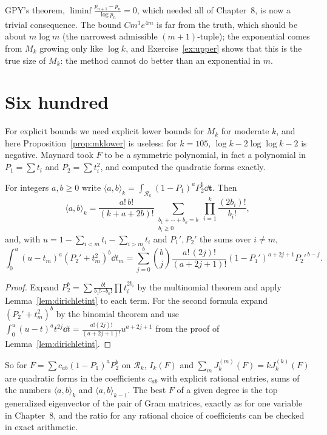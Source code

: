 GPY's theorem, $\liminf\frac{p_{n+1}-p_n}{\log p_n}=0$, which needed all of Chapter~8, is now a trivial consequence. The bound $Cm^3e^{4m}$ is far from the truth, which should be about $m\log m$ (the narrowest admissible $(m+1)$-tuple); the exponential comes from $M_k$ growing only like $\log k$, and Exercise~\ref{ex:upper} shows that this is the true size of $M_k$: the method cannot do better than an exponential in $m$.

\section{Six hundred}

For explicit bounds we need explicit lower bounds for $M_k$ for moderate $k$, and here Proposition~\ref{prop:mklower} is useless: for $k=105$, $\log k-2\log\log k-2$ is negative. Maynard took $F$ to be a symmetric polynomial, in fact a polynomial in $P_1=\sum t_i$ and $P_2=\sum t_i^2$, and computed the quadratic forms exactly.

\begin{lemma}\label{lem:symint}
For integers $a,b\ge0$ write $\langle a,b\rangle_k=\int_{\mathcal R_k}(1-P_1)^aP_2^b\dd\mathbf t$. Then
\[
\langle a,b\rangle_k=\frac{a!\,b!}{(k+a+2b)!}\sum_{\substack{b_1+\cdots+b_k=b\\b_i\ge0}}\prod_{i=1}^k\frac{(2b_i)!}{b_i!},
\]
and, with $u=1-\sum_{i<m}t_i-\sum_{i>m}t_i$ and $P_1',P_2'$ the sums over $i\ne m$,
\[
\int_0^u(u-t_m)^a(P_2'+t_m^2)^b\dd t_m=\sum_{j=0}^b\binom bj\frac{a!\,(2j)!}{(a+2j+1)!}(1-P_1')^{a+2j+1}P_2'^{\,b-j}.
\]
\end{lemma}
\begin{proof}
Expand $P_2^b=\sum\frac{b!}{b_1!\cdots b_k!}\prod t_i^{2b_i}$ by the multinomial theorem and apply Lemma~\ref{lem:dirichletint} to each term. For the second formula expand $(P_2'+t_m^2)^b$ by the binomial theorem and use $\int_0^u(u-t)^at^{2j}\dd t=\frac{a!(2j)!}{(a+2j+1)!}u^{a+2j+1}$ from the proof of Lemma~\ref{lem:dirichletint}.
\end{proof}

So for $F=\sum c_{ab}(1-P_1)^aP_2^b$ on $\mathcal R_k$, $I_k(F)$ and $\sum_mJ_k^{(m)}(F)=kJ_k^{(k)}(F)$ are quadratic forms in the coefficients $c_{ab}$ with explicit rational entries, sums of the numbers $\langle a,b\rangle_k$ and $\langle a,b\rangle_{k-1}$. The best $F$ of a given degree is the top generalized eigenvector of the pair of Gram matrices, exactly as for one variable in Chapter~8, and the ratio for any rational choice of coefficients can be checked in exact arithmetic.

